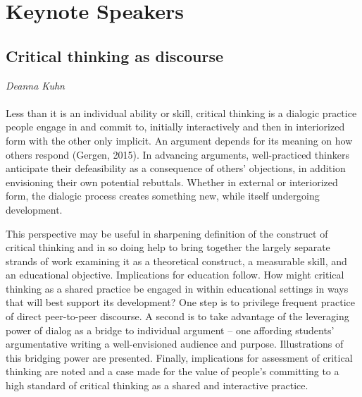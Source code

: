 \section*{Keynote Speakers}
\subsection*{Critical thinking as discourse}
\emph{Deanna Kuhn}
\\\\
Less than it is an individual ability or skill, critical thinking is a dialogic practice people engage in and commit to, initially interactively and then in interiorized form with the other only implicit. An argument depends for its meaning on how others respond (Gergen, 2015). In advancing arguments, well-practiced thinkers anticipate their defeasibility as a consequence of others’ objections, in addition envisioning their own potential rebuttals. Whether in external or interiorized form, the dialogic process creates something new, while itself undergoing development.

This perspective may be useful in sharpening definition of the construct of critical thinking and in so doing help to bring together the largely separate strands of work examining it as a theoretical construct, a measurable skill, and an educational objective. Implications for education follow. How might critical thinking as a shared practice be engaged in within educational settings in ways that will best support its development? One step is to privilege frequent practice of direct peer-to-peer discourse. A second is to take advantage of the leveraging power of dialog as a bridge to individual argument – one affording students’ argumentative writing a well-envisioned audience and purpose. Illustrations of this bridging power are presented.   Finally, implications for assessment of critical thinking are noted and a case made for the value of people’s committing to a high standard of critical thinking as a shared and interactive practice.


